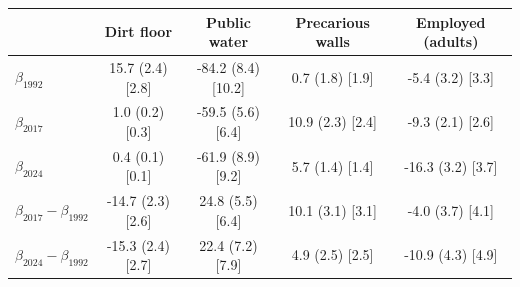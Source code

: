 \begin{tabular}{lcccc}
\toprule
 & Dirt floor & Public water & Precarious walls & Employed (adults) \\
\midrule
$\beta_{1992}$ & 15.7 (2.4) [2.8] & -84.2 (8.4) [10.2] & 0.7 (1.8) [1.9] & -5.4 (3.2) [3.3] \\
$\beta_{2017}$ & 1.0 (0.2) [0.3] & -59.5 (5.6) [6.4] & 10.9 (2.3) [2.4] & -9.3 (2.1) [2.6] \\
$\beta_{2024}$ & 0.4 (0.1) [0.1] & -61.9 (8.9) [9.2] & 5.7 (1.4) [1.4] & -16.3 (3.2) [3.7] \\
\midrule
$\beta_{2017}-\beta_{1992}$ & -14.7 (2.3) [2.6] & 24.8 (5.5) [6.4] & 10.1 (3.1) [3.1] & -4.0 (3.7) [4.1] \\
$\beta_{2024}-\beta_{1992}$ & -15.3 (2.4) [2.7] & 22.4 (7.2) [7.9] & 4.9 (2.5) [2.5] & -10.9 (4.3) [4.9] \\
\bottomrule
\end{tabular}
